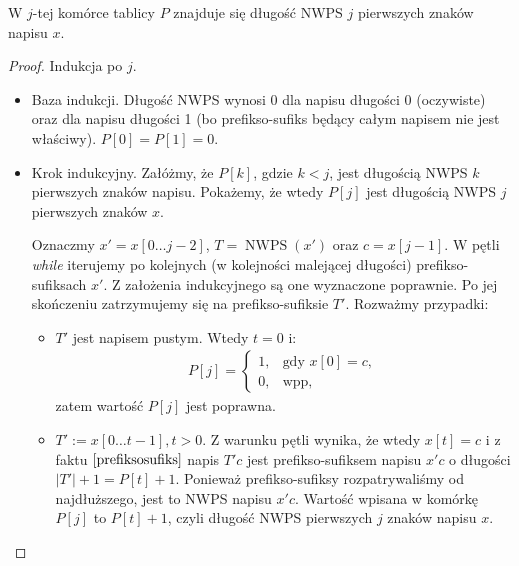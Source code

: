 \begin{theorem}
	\label{thrm:computeP}
	W $j$-tej komórce tablicy $P$ znajduje się długość NWPS $j$ pierwszych znaków napisu $x$.
	\begin{proof}
		Indukcja po $j$.
		\begin{itemize}
			\item Baza indukcji. Długość NWPS wynosi 0 dla napisu długości 0 (oczywiste) oraz dla napisu długości 1 (bo prefikso-sufiks będący całym napisem nie jest właściwy). $P[0]=P[1]=0$.
			\item Krok indukcyjny. Załóżmy, że $P[k]$, gdzie $k<j$, jest długością NWPS $k$ pierwszych znaków napisu. Pokażemy, że wtedy $P[j]$ jest długością NWPS $j$ pierwszych znaków $x$.
			
			Oznaczmy $x' = x[0\dots j-2]$, $T = \operatorname{NWPS}(x')$ oraz $c = x[j-1]$. W pętli \textit{while} iterujemy po kolejnych (w kolejności malejącej długości) prefikso-sufiksach $x'$. Z założenia indukcyjnego są one wyznaczone poprawnie. Po jej skończeniu zatrzymujemy się na prefikso-sufiksie $T'$. Rozważmy przypadki:
			\begin{itemize}
				\item $T'$ jest napisem pustym. Wtedy $t=0$ i:
				\begin{gather*}
					P[j] = 
					\begin{cases}
						1, & \text{gdy } x[0]=c, \\
						0, & \text{wpp},
					\end{cases}
				\end{gather*}
				zatem wartość $P[j]$ jest poprawna.
				\item $T':=x[0 \dots t-1], t > 0$. Z warunku pętli wynika, że wtedy $x[t]=c$ i z faktu $\ref{prefiksosufiks}$ napis $T'c$ jest prefikso-sufiksem napisu $x'c$ o długości $|T'|+1=P[t]+1$. Ponieważ prefikso-sufiksy rozpatrywaliśmy od najdłuższego, jest to NWPS napisu $x'c$. Wartość wpisana w komórkę $P[j]$ to $P[t]+1$, czyli długość NWPS pierwszych $j$ znaków napisu $x$. \qedhere
			\end{itemize}		 
		\end{itemize}
	\end{proof}
\end{theorem}

